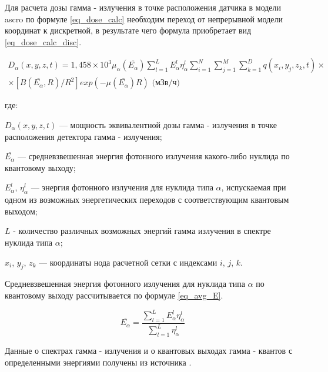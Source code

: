Для расчета дозы гамма - излучения в точке расположения датчика в модели \ac{ascro} по формуле \ref{eq_dose_calc} 
необходим переход от непрерывной модели координат к дискретной, в результате чего формула приобретает вид 
\ref{eq_dose_calc_disc}. 

\begin{equation}
    \begin{aligned}
        \label{eq_dose_calc_disc}
        D_{\alpha}(x, y, z, t) = 1,458 \times 10^{3} \mu_{\alpha}(\overline{E_{\alpha}}) \sum_{l=1}^{L}{E_{\alpha}^{l} 
            \eta_{\alpha}^{l}} \sum_{i=1}^{N} \sum_{j=1}^{M} \sum_{k=1}^{D} q(x_i, y_j, z_k, t) \times \\ \times 
            [B(\overline{E_{\alpha}}, R) / R^{2}] exp(-\mu(\overline{E_{\alpha}})R) \text{ (мЗв/ч)}
    \end{aligned}
\end{equation}

где:
\begin{description}
    \item $D_{\alpha}(x, y, z, t)$ --- мощность эквивалентной дозы гамма - излучения в точке расположения детектора 
        гамма - излучения;
    \item $\overline{E_{\alpha}}$ --- средневзвешенная энергия фотонного излучения какого-либо нуклида по квантовому 
        выходу;
    \item $E_{\alpha}^{l}$, $\eta_{\alpha}^{l}$ --- энергия фотонного излучения для нуклида типа $\alpha$, испускаемая 
        при одном из возможных энергетических переходов с соответствующим квантовым выходом;
    \item $L$ - количество различных возможных энергий гамма излучения в спектре нуклида типа $\alpha$;
    \item $x_i$, $y_j$, $z_k$ --- координаты нода расчетной сетки с индексами $i$, $j$, $k$.
\end{description}

Средневзвешенная энергия фотонного излучения для нуклида типа $\alpha$ по квантовому выходу рассчитывается по формуле 
\ref{eq_avg_E}.

\begin{equation}
        \label{eq_avg_E}
        \overline{E_{\alpha}} = \frac{\sum_{l=1}^{L}{E_{\alpha}^{l}}\eta_{\alpha}^{l}}{\sum_{l=1}^{L}{\eta_{\alpha}^{l}}}
\end{equation}

Данные о спектрах гамма - излучения и о квантовых выходах гамма - квантов с определенными энергиями получены из 
источника \cite{nuc_data}.

